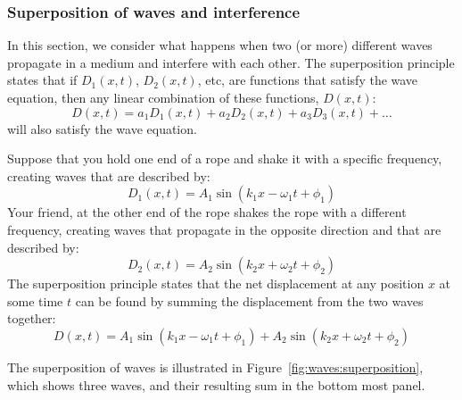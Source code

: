 \subsubsection{Superposition of waves and interference}

In this section, we consider what happens when two (or more) different waves propagate in a medium and interfere with each other. The superposition principle states that if $D_1(x,t)$, $D_2(x,t)$, etc, are functions that satisfy the wave equation, then any linear combination of these functions, $D(x,t)$:
\begin{equation}
D(x,t) = a_1D_1(x,t)+a_2D_2(x,t)+a_3D_3(x,t)+\dots
\end{equation}
will also satisfy the wave equation.

Suppose that you hold one end of a rope and shake it with a specific frequency, creating waves that are described by:
\begin{equation}
D_1(x,t) = A_1\sin(k_1x-\omega_1t+\phi_1)
\end{equation}
Your friend, at the other end of the rope shakes the rope with a different frequency, creating waves that propagate in the opposite direction and that are described by:
\begin{equation}
D_2(x,t) = A_2\sin(k_2x+\omega_2t+\phi_2)
\end{equation}
The superposition principle states that the net displacement at any position $x$ at some time $t$ can be found by summing the displacement from the two waves together:
\begin{equation}
D(x,t) = A_1\sin(k_1x-\omega_1t+\phi_1) + A_2\sin(k_2x+\omega_2t+\phi_2)
\end{equation}

The superposition of waves is illustrated in Figure~\ref{fig:waves:superposition}, which shows three waves, and their resulting sum in the bottom most panel.


